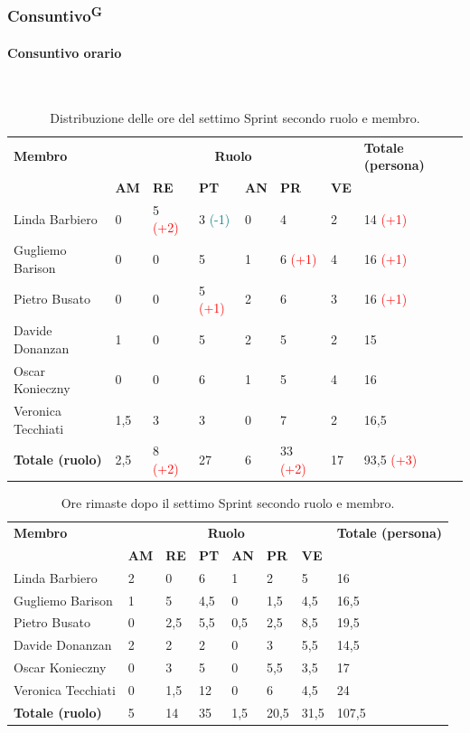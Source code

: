 \documentclass[8pt]{article}
\newcommand{\glossterm}[1]{#1\textsuperscript{G}} %
\newcommand{\subsubsubsection}[1]{\paragraph{#1}\mbox{}\\}
\begin{document}
\subsubsection{\glossterm{Consuntivo}}
\subsubsubsection{Consuntivo orario}
\begin{table}[ht!]
	\centering
	\begin{tabular}{p{4cm} *{6}{l} p{3cm}}
		\toprule
        \textbf{Membro} & \multicolumn{6}{c}{\textbf{Ruolo}} & \textbf{Totale (persona)}\\
		& \textbf{AM} & \textbf{RE} & \textbf{PT} & \textbf{AN} & \textbf{PR} & \textbf{VE}\\
		\midrule
        Linda Barbiero & 0 & 5 \textcolor{red}{(+2)} & 3 \textcolor{teal}{(-1)} & 0 & 4 & 2 & 14 \textcolor{red}{(+1)} \\ 
        Gugliemo Barison & 0 & 0 & 5 & 1 & 6 \textcolor{red}{(+1)} & 4 & 16 \textcolor{red}{(+1)} \\ 
        Pietro Busato & 0 & 0 & 5 \textcolor{red}{(+1)} & 2 & 6 & 3 & 16 \textcolor{red}{(+1)} \\ 
        Davide Donanzan & 1 & 0 & 5 & 2 & 5 & 2 & 15 \\ 
        Oscar Konieczny & 0 & 0 & 6 & 1 & 5 & 4 & 16 \\ 
        Veronica Tecchiati & 1,5 & 3 & 3 & 0 & 7 & 2 & 16,5 \\ 
        \midrule
        \textbf{Totale (ruolo)} & 2,5 & 8 \textcolor{red}{(+2)} & 27 & 6 & 33 \textcolor{red}{(+2)} & 17 & 93,5 \textcolor{red}{(+3)} \\ 
		\bottomrule
	\end{tabular}
	\caption{Distribuzione delle ore del settimo Sprint secondo ruolo e membro.}
	\label{table:Distribuzione delle ore del settimo Sprint secondo ruolo e membro}
\end{table}
\begin{table}[ht!]
	\centering
	\begin{tabular}{p{4cm} p{1cm} p{1cm} p{1cm} p{1cm} p{1cm} p{1cm} p{3cm}}
		\toprule
        \textbf{Membro} & \multicolumn{6}{c}{\textbf{Ruolo}} & \textbf{Totale (persona)}\\
		& \textbf{AM} & \textbf{RE} & \textbf{PT} & \textbf{AN} & \textbf{PR} & \textbf{VE}\\
		\midrule
        Linda Barbiero & 2 & 0 & 6 & 1 & 2 & 5 & 16 \\ 
        Gugliemo Barison & 1 & 5 & 4,5 & 0 & 1,5 & 4,5 & 16,5 \\ 
        Pietro Busato & 0 & 2,5 & 5,5 & 0,5 & 2,5 & 8,5 & 19,5 \\ 
        Davide Donanzan & 2 & 2 & 2 & 0 & 3 & 5,5 & 14,5 \\ 
        Oscar Konieczny & 0 & 3 & 5 & 0 & 5,5 & 3,5 & 17 \\ 
        Veronica Tecchiati & 0 & 1,5 & 12 & 0 & 6 & 4,5 & 24 \\
        \midrule
        \textbf{Totale (ruolo)} & 5 & 14 & 35 & 1,5 & 20,5 & 31,5 & 107,5 \\ 
		\bottomrule
	\end{tabular}
	\caption{Ore rimaste dopo il settimo Sprint secondo ruolo e membro.}
	\label{table:Ore rimaste dopo il settimo Sprint secondo ruolo e membro}
\end{table}
\end{document}

